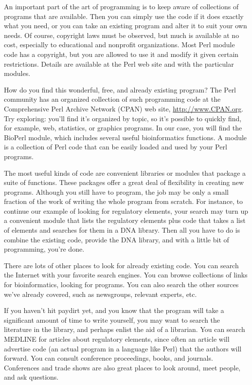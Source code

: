 An important part of the art of programming is to keep aware of collections of programs that are available. Then you can simply use the code if it does exactly what you need, or you can take an existing program and alter it to suit your own needs. Of course, copyright laws must be observed, but much is available at no cost, especially to educational and nonprofit organizations. Most Perl module code has a copyright, but you are allowed to use it and modify it given certain restrictions. Details are available at the Perl web site and with the particular modules.

How do you find this wonderful, free, and already existing program? The Perl community has an organized collection of such programming code at the Comprehensive Perl Archive Network (CPAN) web site, \href{http://www.CPAN.org}{http://www.CPAN.org}. Try exploring: you'll find it's organized by topic, so it's possible to quickly find, for example, web, statistics, or graphics programs. In our case, you will find the BioPerl module, which includes several useful bioinformatics functions. A module is a collection of Perl code that can be easily loaded and used by your Perl programs.

The most useful kinds of code are convenient libraries or modules that package a suite of functions. These packages offer a great deal of flexibility in creating new programs. Although you still have to program, the job may be only a small fraction of the work of writing the whole program from scratch. For instance, to continue our example of looking for regulatory elements, your search may turn up a convenient module that lists the regulatory elements plus code that takes a list of elements and searches for them in a DNA library. Then all you have to do is combine the existing code, provide the DNA library, and with a little bit of programming, you're done.

There are lots of other places to look for already existing code. You can search the Internet with your favorite search engines. You can browse collections of links for bioinformatics, looking for programs. You can also search the other sources we've already covered, such as newsgroups, relevant experts, etc.

If you haven't hit paydirt yet, and you know that the program will take a significant amount of time to write yourself, you may want to search the literature in the library, and perhaps enlist the aid of a librarian. You can search MEDLINE for articles about regulatory elements, since often an article will advertise code (an actual program in a language like Perl) that the authors will forward. You can consult conference proceedings, books, and journals. Conferences and trade shows are also great places to look around, meet people, and ask questions.

